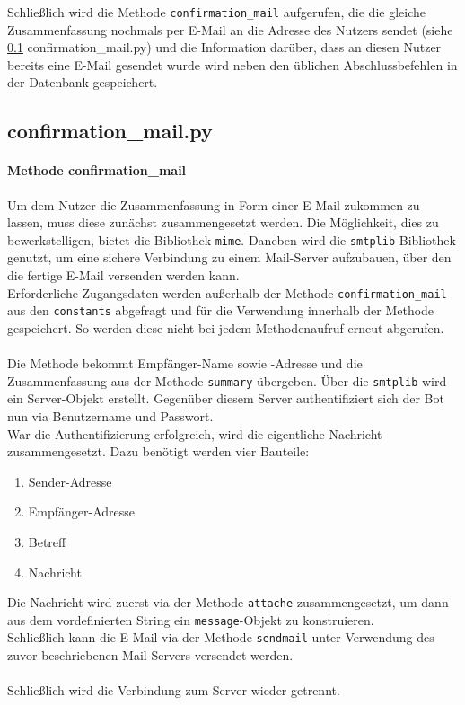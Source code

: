             Schließlich wird die Methode \verb|confirmation_mail| aufgerufen, die die gleiche Zusammenfassung nochmals per E-Mail an die Adresse des Nutzers sendet (siehe \ref{confirmation_mail.py} confirmation\_mail.py) und die Information darüber, dass an diesen Nutzer bereits eine E-Mail gesendet wurde wird neben den üblichen Abschlussbefehlen in der Datenbank gespeichert.

                    
        \subsection{confirmation\_mail.py} \label{confirmation_mail.py}
            \paragraph{Methode confirmation\_mail}
                Um dem Nutzer die Zusammenfassung in Form einer E-Mail zukommen zu lassen, muss diese zunächst zusammengesetzt werden. Die Möglichkeit, dies zu bewerkstelligen, bietet die Bibliothek \verb|mime|. \cite{email.mime} Daneben wird die \verb|smtplib|-Bibliothek genutzt, um eine sichere Verbindung zu einem Mail-Server aufzubauen, über den die fertige E-Mail versenden werden kann. \cite{smtplib}\\

                Erforderliche Zugangsdaten werden außerhalb der Methode \verb|confirmation_mail| aus den \verb|constants| abgefragt und für die Verwendung innerhalb der Methode gespeichert. So werden diese nicht bei jedem Methodenaufruf erneut abgerufen.\\
                \\
                Die Methode bekommt Empfänger-Name sowie -Adresse und die Zusammenfassung aus der Methode \verb|summary| übergeben. Über die \verb|smtplib| wird ein Server-Objekt erstellt. Gegenüber diesem Server authentifiziert sich der Bot nun via Benutzername und Passwort.\\
                War die Authentifizierung erfolgreich, wird die eigentliche Nachricht zusammengesetzt. Dazu benötigt werden vier Bauteile: 
                \begin{enumerate}
                    \item Sender-Adresse
                    \item Empfänger-Adresse
                    \item Betreff
                    \item Nachricht
                \end{enumerate}
                Die Nachricht wird zuerst via der Methode \verb|attache| zusammengesetzt, um dann aus dem vordefinierten String ein \verb|message|-Objekt zu konstruieren.\\
                Schließlich kann die E-Mail via der Methode \verb|sendmail| unter Verwendung des zuvor beschriebenen Mail-Servers versendet werden.\\
                \\
                Schließlich wird die Verbindung zum Server wieder getrennt.



